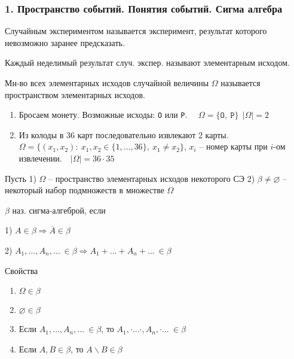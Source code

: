 
\subsubsection*{1. Пространство событий. Понятия событий. Сигма алгебра}

\OPR Случайным экспериментом называется эксперимент, результат которого невозможно заранее предсказать.

\OPR Каждый неделимый результат случ. экспер. называют элементарным исходом.

\OPR Мн-во всех элементарных исходов случайной величины $\Omega$ называется пространством элементарных исходов.

\PRIM
\begin{enumerate}[topsep=0pt, leftmargin=18pt, noitemsep]
	\item Бросаем монету. Возможные исходы: \texttt{O} или \texttt{P}.~~ $\Omega = \{\texttt{O},~\texttt{P}\}~~|\Omega|=2$
	
	\item Из колоды в 36 карт последовательно извлекают 2 карты.~~ 
	$\Omega=\{(x_1,x_2):~x_1,x_2\in \{1,\dots,36\},~x_1\neq x_2\}$, $x_i$ -- 
	номер карты при $i$-ом извлечении.~~$|\Omega|=36\cdot 35$
\end{enumerate}

Пусть 1) $\Omega$ -- пространство элементарных исходов некоторого СЭ 2) $\beta\neq\varnothing$ -- некоторый набор подмножеств в множестве $\Omega$

\OPR $\beta$ наз. сигма-алгеброй, если

1) $A\in\beta\Rightarrow\overline{A}\in\beta$ 

2) $A_1,\dots,A_n,\dots~\in \beta\Rightarrow A_1+...+A_n+\dots~\in \beta$

Свойства
\begin{enumerate}[topsep=0pt, leftmargin=20pt, noitemsep, label=\arabic*\degree]
	\item $\Omega\in \beta$
	
	\item $\varnothing\in \beta$
	
	\item Если $A_1,\dots,A_n,\dots~\in \beta$, то $A_1,\cdot...\cdot,A_n,\cdot\dots~\in \beta$
	
	\item Если $A, B\in \beta$, то $A\backslash B\in \beta$
\end{enumerate}

